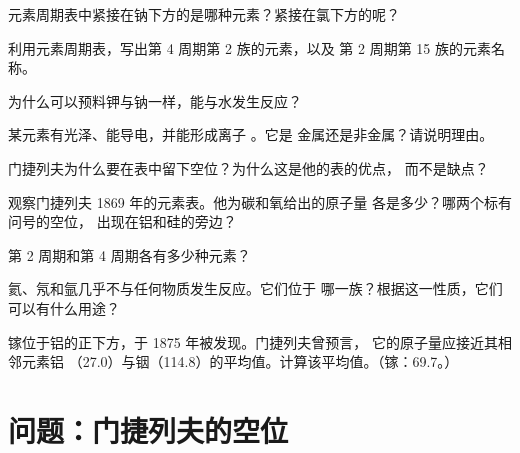 \begin{exercise}[$\star$]\label{exo:g9:periodic-table-first-look:4}
元素周期表中紧接在钠下方的是哪种元素？紧接在氯下方的呢？
\end{exercise}

\begin{exercise}[$\star\star$]\label{exo:g9:periodic-table-first-look:5}
利用元素周期表，写出第 4 周期第 2 族的元素，以及
第 2 周期第 15 族的元素名称。
\end{exercise}

\begin{exercise}[$\star\star$]\label{exo:g9:periodic-table-first-look:6}
为什么可以预料钾与钠一样，能与水发生反应？
\end{exercise}

\begin{exercise}[$\star\star$]\label{exo:g9:periodic-table-first-look:7}
某元素有光泽、能导电，并能形成离子 。它是
金属还是非金属？请说明理由。
\end{exercise}

\begin{exercise}[$\star\star$]\label{exo:g9:periodic-table-first-look:8}
门捷列夫为什么要在表中留下空位？为什么这是他的表的优点，
而不是缺点？
\end{exercise}

\begin{exercise}[$\star\star$]\label{exo:g9:periodic-table-first-look:9}
观察门捷列夫 1869 年的元素表。他为碳和氧给出的原子量
各是多少？哪两个标有问号的空位，
出现在铝和硅的旁边？
\end{exercise}

\begin{exercise}[$\star\star$]\label{exo:g9:periodic-table-first-look:10}
第 2 周期和第 4 周期各有多少种元素？
\end{exercise}

\begin{exercise}[$\star\star\star$]\label{exo:g9:periodic-table-first-look:11}
氦、氖和氩几乎不与任何物质发生反应。它们位于
哪一族？根据这一性质，它们可以有什么用途？
\end{exercise}

\begin{exercise}[$\star\star\star$]\label{exo:g9:periodic-table-first-look:12}
镓位于铝的正下方，于 1875 年被发现。门捷列夫曾预言，
它的原子量应接近其相邻元素铝
（27.0）与铟（114.8）的平均值。计算该平均值。（镓：69.7。）
\end{exercise}

\section{问题：门捷列夫的空位}

